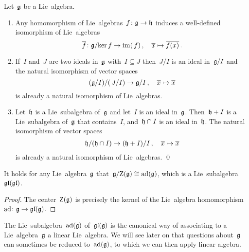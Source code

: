 \begin{corollary}
  Let~$\mathfrak{g}$ be a Lie~algebra.
  \begin{enumerate}
    \item
      Any homomorphism of Lie~algebras~$f \colon \mathfrak{g} \to \mathfrak{h}$ induces a well-defined isomorphism of Lie~algebras
      \[
        \overline{f}
        \colon
        \mathfrak{g}/{\ker f}
        \to
        \operatorname{im}(\, f)  \,,
        \quad
        \overline{x}
        \mapsto
        \overline{f(x)}  \,.
      \]
    \item
      If~$I$ and~$J$ are two ideals in~$\mathfrak{g}$ with~$I \subseteq J$ then~$J/I$ is an ideal in~$\mathfrak{g}/I$ and the natural isomorphism of vector spaces
      \[
        (\mathfrak{g}/I) / (\, J/I)
        \to
        \mathfrak{g}/I \,,
        \quad
        \overline{x}
        \mapsto
        \overline{x}
      \]
      is already a natural isomorphism of Lie~algebras.
    \item
      Let~$\mathfrak{h}$ is a Lie~subalgebra of~$\mathfrak{g}$ and let~$I$ is an ideal in~$\mathfrak{g}$.
      Then~$\mathfrak{h} + I$ is a Lie~subalgebra of~$\mathfrak{g}$ that contains~$I$, and~$\mathfrak{h} \cap I$ is an ideal in~$\mathfrak{h}$.
      The natural isomorphism of vector spaces
      \begin{gather*}
        \mathfrak{h}/(\mathfrak{h} \cap I)
        \to
        (\mathfrak{h} + I)/I \,,
        \quad
        \overline{x}
        \mapsto
        \overline{x}
      \end{gather*}
      is already a natural isomorphism of Lie~algebras.
    \qed
  \end{enumerate}
\end{corollary}


\begin{corollary}
  It holds for any Lie~algebra~$\mathfrak{g}$ that~$\mathfrak{g}/{\operatorname{Z}(\mathfrak{g})} \cong \operatorname{ad}(\mathfrak{g})$, which is a Lie~subalgebra~$\mathfrak{gl}(\mathfrak{gl})$.
\end{corollary}


\begin{proof}
  The center~$\operatorname{Z}(\mathfrak{g})$ is precisely the kernel of the Lie~algebra homomorphism~$\operatorname{ad} \colon \mathfrak{g} \to \mathfrak{gl}(\mathfrak{g})$.
\end{proof}


\begin{remark}
  The Lie~subalgebra~$\operatorname{ad}(\mathfrak{g})$ of~$\mathfrak{gl}(\mathfrak{g})$ is the canonical way of associating to a Lie~algebra~$\mathfrak{g}$ a linear Lie~algebra.
  We will see later on that questions about~$\mathfrak{g}$ can sometimes be reduced to~$\operatorname{ad}(\mathfrak{g})$, to which we can then apply linear algebra.
\end{remark}


